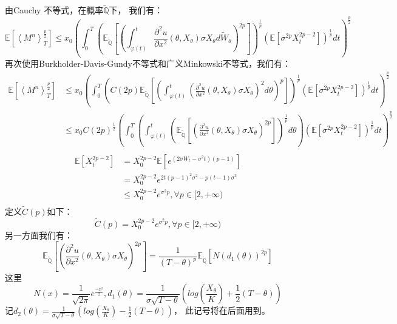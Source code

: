 由Cauchy 不等式，在概率$\widetilde{\mathbb{Q}}$下， 我们有：
\begin{equation}
\mathbb{E}[\left \langle M^n \right \rangle_T^{\frac{p}{2}}]\leq x_0
(\int_0^T(\mathbb{E}_{\widetilde{\mathbb{Q}}}[(\int_{\varphi(t)}^t \frac{\partial^2 u}{\partial x^2}(\theta, X_\theta)\sigma X_\theta d\widetilde{W}_\theta)^{2p}])^{\frac{1}{p}}(\mathbb{E}[\sigma^{2p} X_t^{2p-2}] )^{\frac{1}{p}}dt)^{\frac{p}{2}}
\end{equation}
再次使用Burkholder-Davis-Gundy不等式和广义Minkowski不等式，我们有：
\begin{equation}
\begin{split}
\mathbb{E}[\left \langle M^n \right \rangle_T^{\frac{p}{2}}]&\leq x_0
(\int_0^T(C(2p)\mathbb{E}_{\widetilde{\mathbb{Q}}}[(\int_{\varphi(t)}^t (\frac{\partial^2 u}{\partial x^2}(\theta, X_\theta)\sigma X_\theta)^2 d\theta)^{p}])^{\frac{1}{p}}(\mathbb{E}[\sigma^{2p} X_t^{2p-2}] )^{\frac{1}{p}}dt)^{\frac{p}{2}}\\
&\leq x_0C(2p)^{\frac{1}{2}}(\int_0^T(\int_{\varphi(t)}^t(\mathbb{E}_{\widetilde{\mathbb{Q}}}[ (\frac{\partial^2 u}{\partial x^2}(\theta, X_\theta)\sigma X_\theta)^{2p}])^{\frac{1}{p}} d\theta)(\mathbb{E}[\sigma^{2p} X_t^{2p-2}] )^{\frac{1}{p}}dt)^{\frac{p}{2}}\\
\end{split}
\end{equation}
\begin{equation}
\begin{split}
\mathbb{E}[X_t^{2p-2}]&=X_0^{2p-2}\mathbb{E}[e^{(2\sigma W_t-\sigma^2t)(p-1)}]\\
&=X_0^{2p-2}e^{2t(p-1)^2\sigma^2-p(t-1)\sigma^2}\\
&\leq
X_0^{2p-2}e^{\sigma^2p}, \forall p\in [2, +\infty)\\
\end{split}
\end{equation}
定义$\widetilde{C}(p)$如下： 
\begin{equation}
\widetilde{C}(p)=
X_0^{2p-2}e^{\sigma^2p}, \forall p\in  [2, +\infty)
\end{equation}
另一方面我们有：
\begin{equation}
\mathbb{E}_{\widetilde{\mathbb{Q}}}[ (\frac{\partial^2 u}{\partial x^2}(\theta, X_\theta)\sigma X_\theta)^{2p}]=\frac{1}{(T-\theta)^p}\mathbb{E}_{\widetilde{\mathbb{Q}}}[N(d_1(\theta))^{2p}]
\end{equation}
这里
\begin{equation}
N(x)=\frac{1}{\sqrt{2\pi}}e^{\frac{-x^2}{2}}, d_1(\theta)=\frac{1}{\sigma\sqrt{T-\theta}}(log(\frac{X_\theta}{K})+\frac{1}{2}(T-\theta))
\end{equation}
记$d_2(\theta)=\frac{1}{\sigma\sqrt{T-\theta}}(log(\frac{X_\theta}{K})-\frac{1}{2}(T-\theta))$， 此记号将在后面用到。

